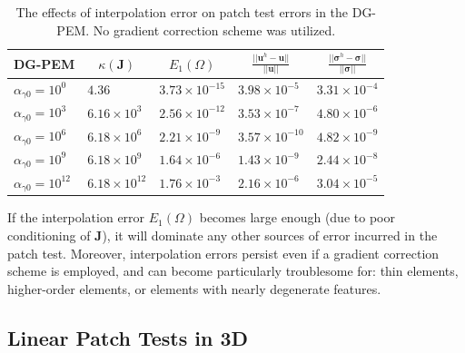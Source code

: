 \begin{table}[!ht]
  \begin{center}
    \begin{tabular}{| l || l | l | l | l |}
    \hline
    \multicolumn{1}{|c||}{DG-PEM} & \multicolumn{1}{|c|}{$\kappa(\bm{J})$} &  \multicolumn{1}{c}{$E_1 (\Omega)$} & \multicolumn{1}{|c|}{$\frac{||\bm{u}^h - \bm{u}||}{||\bm{u}||}$} & \multicolumn{1}{|c|}{$\frac{||\boldsymbol{\sigma}^h - \boldsymbol{\sigma}||}{||\boldsymbol{\sigma}||}$} \\ \hline \hline
    $\alpha_{\gamma0} = 10^{0}$ & $4.36$ & $3.73 \times 10^{-15}$ & $3.98 \times 10^{-5}$ & $3.31 \times 10^{-4}$ \\ \hline
    $\alpha_{\gamma0} = 10^{3}$ & $6.16 \times 10^{3}$ & $2.56 \times 10^{-12}$ & $3.53 \times 10^{-7}$ & $4.80 \times 10^{-6}$ \\ \hline
    $\alpha_{\gamma0} = 10^{6}$ & $6.18 \times 10^{6}$ & $2.21 \times 10^{-9}$ & $3.57 \times 10^{-10}$ & $4.82 \times 10^{-9}$ \\ \hline
    $\alpha_{\gamma0} = 10^{9}$ & $6.18 \times 10^{9}$ & $1.64 \times 10^{-6}$ & $1.43 \times 10^{-9}$ & $2.44 \times 10^{-8}$ \\ \hline
    $\alpha_{\gamma0} = 10^{12}$ & $6.18 \times 10^{12}$ & $1.76 \times 10^{-3}$ & $2.16 \times 10^{-6}$ & $3.04 \times 10^{-5}$ \\
    \hline
    \end{tabular}
    \caption{The effects of interpolation error on patch test errors in the DG-PEM. No gradient correction scheme was utilized.}
    \vspace{-5pt}
    \label{tab:interpolation_patch_test_error}
    \vspace{-10pt}
  \end{center}
\end{table}

If the interpolation error $E_1 (\Omega)$ becomes large enough (due to poor conditioning of $\bm{J}$), it will dominate any other sources of error incurred in the patch test. Moreover, interpolation errors persist even if a gradient correction scheme is employed, and can become particularly troublesome for: thin elements, higher-order elements, or elements with nearly degenerate features.

\subsection*{Linear Patch Tests in 3D}

